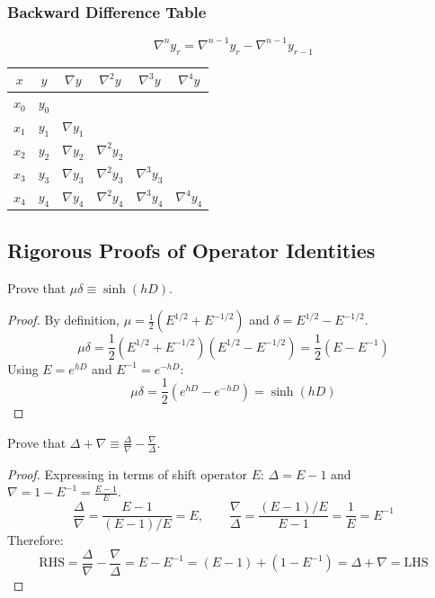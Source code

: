 \documentclass[11pt,a4paper]{article}
\begin{document}
\subsubsection{Backward Difference Table}
$$\nabla^n y_r = \nabla^{n-1} y_r - \nabla^{n-1} y_{r-1}$$
\begin{center}
\begin{tabular}{cccccc}
    \toprule
    $x$ & $y$ & $\nabla y$ & $\nabla^2 y$ & $\nabla^3 y$ & $\nabla^4 y$ \\
    \midrule
    $x_0$ & $y_0$ & & & & \\
    $x_1$ & $y_1$ & $\nabla y_1$ & & & \\
    $x_2$ & $y_2$ & $\nabla y_2$ & $\nabla^2 y_2$ & & \\
    $x_3$ & $y_3$ & $\nabla y_3$ & $\nabla^2 y_3$ & $\nabla^3 y_3$ & \\
    $x_4$ & $y_4$ & $\nabla y_4$ & $\nabla^2 y_4$ & $\nabla^3 y_4$ & $\nabla^4 y_4$ \\
    \bottomrule
\end{tabular}
\end{center}

\subsection{Rigorous Proofs of Operator Identities}

\begin{theorembox}[Operator Identity 1: $\mu \delta = \sinh(hD)$]
Prove that $\mu \delta \equiv \sinh(hD)$.
\end{theorembox}
\begin{proof}
By definition, $\mu = \frac{1}{2}(E^{1/2} + E^{-1/2})$ and $\delta = E^{1/2} - E^{-1/2}$.
$$\mu \delta = \frac{1}{2}\left(E^{1/2} + E^{-1/2}\right)\left(E^{1/2} - E^{-1/2}\right) = \frac{1}{2}\left(E - E^{-1}\right)$$
Using $E = e^{hD}$ and $E^{-1} = e^{-hD}$:
$$\mu \delta = \frac{1}{2}\left(e^{hD} - e^{-hD}\right) = \sinh(hD)$$
\end{proof}

\begin{theorembox}
Prove that $\Delta + \nabla \equiv \frac{\Delta}{\nabla} - \frac{\nabla}{\Delta}$.
\end{theorembox}
\begin{proof}
Expressing in terms of shift operator $E$: $\Delta = E - 1$ and $\nabla = 1 - E^{-1} = \frac{E - 1}{E}$.
$$\frac{\Delta}{\nabla} = \frac{E - 1}{(E-1)/E} = E, \qquad \frac{\nabla}{\Delta} = \frac{(E-1)/E}{E-1} = \frac{1}{E} = E^{-1}$$
Therefore:
$$\text{RHS} = \frac{\Delta}{\nabla} - \frac{\nabla}{\Delta} = E - E^{-1} = (E - 1) + (1 - E^{-1}) = \Delta + \nabla = \text{LHS}$$
\end{proof}
\end{document}
